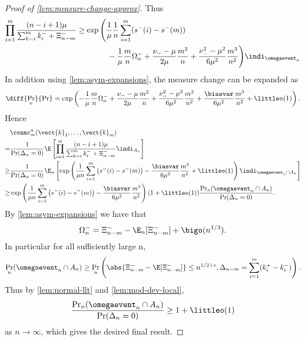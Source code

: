 \begin{proof}[Proof of \cref{lem:measure-change-approx}]
    Thus
    \begin{align*}
        \prod_{i=1}^m \frac{(n-i+1)\mu}{\sum_{k=i}^m k^-_i + \Xi^-_{n-m}}
        &\geq \exp \Bigg( \frac{1}{\mu} \frac{1}{n} \sum_{i=1}^m (s^-(i) - s^-(m)) \nonumber \\
        &\hspace{4em} - \frac{1}{\mu} \frac{m}{n} \Omega^-_n + \frac{\nu_- - \mu}{2 \mu} \frac{m^2}{n} + \frac{\nu_-^2 - \mu^2}{6 \mu^2} \frac{m^3}{n^2} \Bigg) \indi_{\omegaevent_n}
    \end{align*}
    In addition using \cref{lem:asym-expansions}, the measure change can be expanded as
    \begin{equation*}
        \diff{\Pr_n}{\Pr} = \exp \left( 
            - \frac{1}{\mu} \frac{m}{n} \Omega_n^- + \frac{\nu_- - \mu}{2\mu} \frac{m^2}{n}
            + \frac{\nu_-^2 - \mu^2}{6 \mu^2} \frac{m^3}{n^2} + \frac{\biasvar}{6 \mu^2} \frac{m^3}{n^2} + \littleo(1)
         \right).
    \end{equation*}
    Hence
    \begin{align*}
        &\conmc^n_m(\vect{k}_1, \ldots, \vect{k}_m) \\
        =& \frac{1}{\Pr(\Delta_n = 0)} \E \left[\prod_{i=1}^m \frac{(n-i+1)\mu}{\sum_{k=i}^m k^-_i + \Xi^-_{n-m}} \indi_{A_n} \right] \\
        \geq& \frac{1}{\Pr(\Delta_n = 0)} \E_n \left[ \exp \left(
                \frac{1}{\mu n} \sum_{i=1}^m \left( s^-(i) - s^-(m) \right)
                - \frac{\biasvar}{6 \mu^2} \frac{m^3}{n^2} + \littleo(1)
            \right) \indi_{\omegaevent_n \cap A_n} \right] \\
        \geq& \exp \left(
                \frac{1}{\mu n} \sum_{i=1}^m \left( s^-(i) - s^-(m) \right)
                - \frac{\biasvar}{6 \mu^2} \frac{m^3}{n^2}
            \right) (1 + \littleo(1)) \frac{\Pr_n(\omegaevent_n \cap A_n)}{\Pr(\Delta_n = 0)}.
    \end{align*}
    By \cref{lem:asym-expansions} we have that
    \begin{equation*}
        \Omega^-_n = \Xi^-_{n-m} - \E_n[\Xi^-_{n-m}] + \bigo(n^{1/3}).
    \end{equation*}
    In particular for all sufficiently large n,
    \begin{equation*}
        \Pr_n(\omegaevent_n \cap A_n) \geq
        \Pr_n\left(
            \abs{\Xi^-_{n-m} - \E[\Xi^-_{n-m}]} \leq n^{1/2 + \epsilon}, \Delta_{n-m} = \sum_{i=1}^m (k^+_i - k^-_i)
        \right).
    \end{equation*}
    Thus by \cref{lem:normal-llt} and \cref{lem:mod-dev-local},
    \begin{equation*}
        \frac{\Pr_n(\omegaevent_n \cap A_n)}{\Pr(\Delta_n = 0)} \geq 1 + \littleo(1)
    \end{equation*}
    as $n \to \infty$, which gives the desired final result.
\end{proof}

